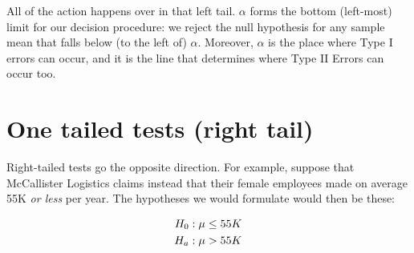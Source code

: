 \documentclass[../../../main.tex]{subfiles}
\begin{document}
\begin{center}
\end{center}

\noindent
All of the action happens over in that left tail. $\alpha$ forms the bottom (left-most) limit for our decision procedure: we reject the null hypothesis for any sample mean that falls below (to the left of) $\alpha$. Moreover, $\alpha$ is the place where Type I errors can occur, and it is the line that determines where Type II Errors can occur too.


\section{One tailed tests (right tail)}

Right-tailed tests go the opposite direction. For example, suppose that McCallister Logistics claims instead that their female employees made on average 55K \emph{or less} per year. The hypotheses we would formulate would then be these:

\begin{align*}
  \NullHyp/: \populationmean \leq 55K \\
  \AltHyp/: \populationmean > 55K
\end{align*}
\end{document}
